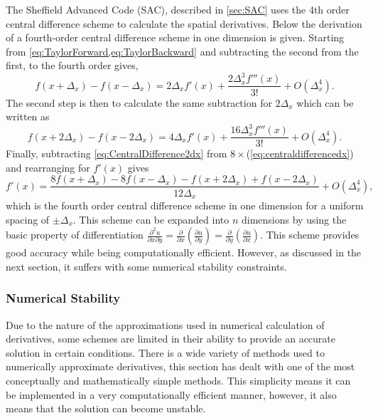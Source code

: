 \documentclass[a4paper,12pt,fourier,authoryear,custommargin]{Classes/PhDThesisPSnPDF}
\begin{document}
The Sheffield Advanced Code (SAC), described in \cref{sec:SAC} uses the 4th order central difference scheme to calculate the spatial derivatives.
Below the derivation of a fourth-order central difference scheme in one dimension is given.
Starting from \cref{eq:TaylorForward,eq:TaylorBackward} and subtracting the second from the first, to the fourth order gives,
\begin{equation}
f(x+\Delta_{x})-f(x-\Delta_{x})=2\Delta_{x}f'(x)+\frac{2\Delta_{x}^{3}f'''(x)}{3!}+O(\Delta_{x}^{4}).\label{eq:centraldifferencedx}
\end{equation}
The second step is then to calculate the same subtraction for $2\Delta_{x}$ which can be written as
\begin{equation}
f(x+2\Delta_{x})-f(x-2\Delta_{x})=4\Delta_{x}f'(x)+\frac{16\Delta_{x}^{3}f'''(x)}{3!}+O(\Delta_{x}^{4}).\label{eq:CentralDifference2dx}
\end{equation}
Finally, subtracting \cref{eq:CentralDifference2dx} from $8\times$(\cref{eq:centraldifferencedx}) and rearranging for $f'(x)$ gives
\begin{equation}
f'(x)=\frac{8f(x+\Delta_{x})-8f(x-\Delta_{x})-f(x+2\Delta_{x})+f(x-2\Delta_{x})}{12\Delta_{x}}+O(\Delta_{x}^{4}),\label{eq:4thOrderCentralDifferenceUniform}
\end{equation}
which is the fourth order central difference scheme in one dimension for a uniform spacing of $\pm\Delta_{x}$.
This scheme can be expanded into $n$ dimensions by using the basic property of differentiation $\frac{\partial^{2}u}{\partial x\partial y}=\frac{\partial}{\partial x}\left(\frac{\partial u}{\partial y}\right)=\frac{\partial}{\partial y}\left(\frac{\partial u}{\partial x}\right)$.
This scheme provides good accuracy while being computationally efficient.
However, as discussed in the next section, it suffers with some numerical stability constraints.


\subsubsection{Numerical Stability}

Due to the nature of the approximations used in numerical calculation of derivatives, some schemes are limited in their ability to provide an accurate solution in certain conditions.
There is a wide variety of methods used to numerically approximate derivatives, this section has dealt with one of the most conceptually and mathematically simple methods.
This simplicity means it can be implemented in a very computationally efficient manner, however, it also means that the solution can become unstable.
\end{document}

